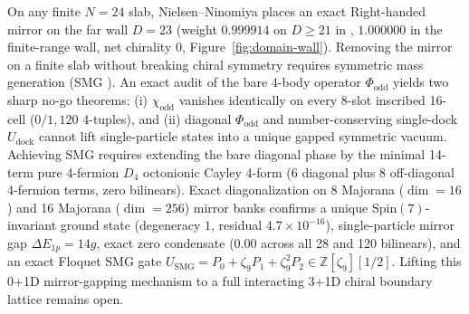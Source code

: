On any finite $N = 24$ slab, Nielsen--Ninomiya \cite{nielsen1981} places an exact Right-handed mirror on the far wall
$D = 23$ (weight $0.999914$ on $D \ge 21$ in , $1.000000$ in the finite-range wall, net chirality $0$,
Figure~\ref{fig:domain-wall}). Removing the mirror on a finite slab without breaking chiral symmetry requires symmetric
mass generation (SMG \cite{wang2022smg}). An exact audit of the bare 4-body operator $\Phi_{\mathrm{odd}}$ yields two
sharp no-go theorems: (i) $\chi_{\mathrm{odd}}$ vanishes identically on every 8-slot inscribed 16-cell ($0/1{,}120$
4-tuples), and (ii) diagonal $\Phi_{\mathrm{odd}}$ and number-conserving single-dock $U_{\mathrm{dock}}$ cannot lift
single-particle states into a unique gapped symmetric vacuum. Achieving SMG requires extending the bare diagonal phase
by the minimal 14-term pure 4-fermion $D_4$ octonionic Cayley 4-form (6 diagonal plus 8 off-diagonal 4-fermion terms,
zero bilinears). Exact diagonalization on 8 Majorana ($\dim = 16$) and 16 Majorana ($\dim = 256$) mirror banks
confirms a unique $\mathrm{Spin}(7)$-invariant ground state (degeneracy $1$, residual $4.7 \times 10^{-16}$),
single-particle mirror gap $\Delta E_{1p} = 14 g$, exact zero condensate ($0.00$ across all 28 and 120 bilinears), and
an exact Floquet SMG gate $U_{\mathrm{SMG}} = P_0 + \zeta_9 P_1 + \zeta_9^2 P_2 \in \mathbb{Z}[\zeta_9][1/2]$.
Lifting this 0+1D mirror-gapping mechanism to a full interacting 3+1D chiral boundary lattice remains open.

